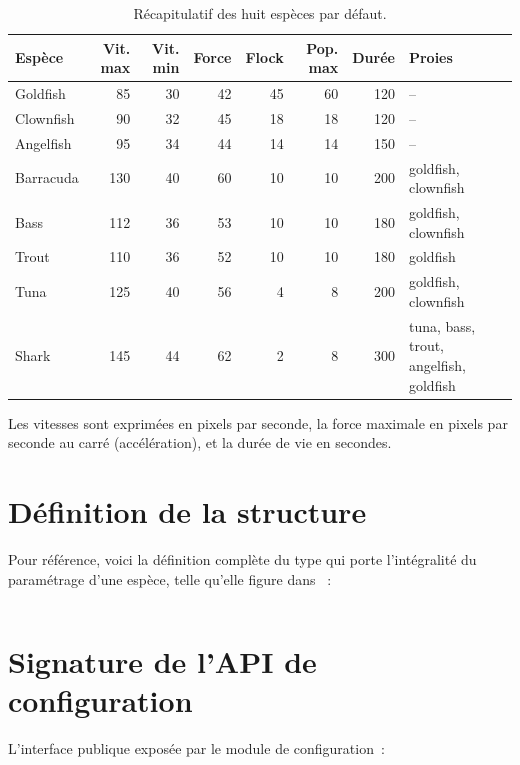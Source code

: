 \begin{table}[h!]
\centering
\scriptsize
\setlength{\tabcolsep}{4pt}
\begin{tabular}{@{}lrrrrrrl@{}}
\toprule
\textbf{Espèce} & \textbf{Vit. max} & \textbf{Vit. min} &
\textbf{Force} & \textbf{Flock} & \textbf{Pop. max} & \textbf{Durée} &
\textbf{Proies} \\
\midrule
Goldfish   & 85  & 30 & 42 & 45 & 60 & 120 & -- \\
Clownfish  & 90  & 32 & 45 & 18 & 18 & 120 & -- \\
Angelfish  & 95  & 34 & 44 & 14 & 14 & 150 & -- \\
Barracuda  & 130 & 40 & 60 & 10 & 10 & 200 & goldfish, clownfish \\
Bass       & 112 & 36 & 53 & 10 & 10 & 180 & goldfish, clownfish \\
Trout      & 110 & 36 & 52 & 10 & 10 & 180 & goldfish \\
Tuna       & 125 & 40 & 56 &  4 &  8 & 200 & goldfish, clownfish \\
Shark      & 145 & 44 & 62 &  2 &  8 & 300 & tuna, bass, trout, angelfish, goldfish \\
\bottomrule
\end{tabular}
\caption{Récapitulatif des huit espèces par défaut.}
\label{tab:species-summary}
\end{table}

Les vitesses sont exprimées en pixels par seconde, la force
maximale en pixels par seconde au carré (accélération), et la
durée de vie en secondes.

\chapter{Définition de la structure }
\label{ann:species-struct}

Pour référence, voici la définition complète du type qui porte
l'intégralité du paramétrage d'une espèce, telle qu'elle figure
dans ~:

\inputminted[fontsize=\footnotesize, frame=lines, linenos]{c}{../include/species.h}

\chapter{Signature de l'API de configuration}
\label{ann:conf-api}

L'interface publique exposée par le module de configuration~:

\inputminted[fontsize=\footnotesize, frame=lines, linenos]{c}{../include/conf.h}
